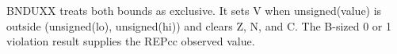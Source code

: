 BNDUXX treats both bounds as exclusive. It sets V when unsigned(value) is outside (unsigned(lo), unsigned(hi)) and clears Z, N, and C. The B-sized 0 or 1 violation result supplies the REPcc observed value.
